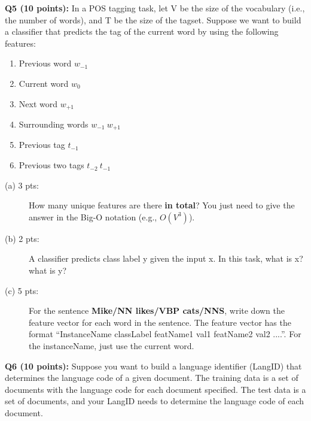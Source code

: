 \documentclass[11pt]{article}
\begin{document}
\vspace{0.3in}
\hspace{-0.3in}
{\bf Q5 (10 points):} In a POS tagging task, let V be the
size of the vocabulary (i.e., the number of words), and 
T be the size of the tagset.
Suppose we want to build a classifier that predicts the tag of 
  the current word by using the following features:
\begin{enumerate}
  \item Previous word $w_{-1}$
  \item Current word $w_0$
  \item Next word $w_{+1}$
  \item Surrounding words $w_{-1} \ w_{+1}$
  \item Previous tag $t_{-1}$
  \item Previous two tags $t_{-2} \ t_{-1}$
\end{enumerate}

\begin{description}
\item [(a) 3 pts:] How many unique features are there {\bf in total}?
       You just need to give the answer in the Big-O notation (e.g., $O(V^3)$).

  \item [(b) 2 pts:] A classifier predicts class label y given the input x.
        In this task, what is x? what is y?


  \item [(c) 5 pts:] For the sentence {\bf Mike/NN likes/VBP cats/NNS}, 
  write down the feature vector for each word in the sentence.
  The feature vector has the format 
     ``InstanceName classLabel featName1 val1 featName2 val2 ....''.
     For the instanceName, just use the current word.

\end{description} 




 


\vspace{0.3 in}
\hspace{-0.3in}
       {\bf Q6 (10 points):} Suppose you want to build a language identifier (LangID)
       that determines the language code of a given document.
  The training data is a set of documents with the language code for each
  document specified. The test data is a set of documents, and your LangID
  needs to determine the language code of each document. 
\end{document}
